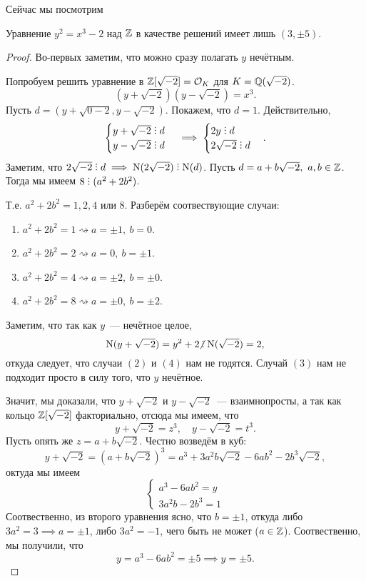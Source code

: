 	Сейчас мы посмотрим 
	\begin{statement} 
		Уравнение $y^2 = x^3 - 2$ над $\mathbb{Z}$ в качестве решений имеет лишь $(3, \pm 5)$.
	\end{statement}
	\begin{proof}
		Во-первых заметим, что можно сразу полагать $y$ нечётным. 

		Попробуем решить уравнение в $\mathbb{Z}[\sqrt{-2}] = \mathcal{O}_{K}$ для $K = \mathbb{Q}(\sqrt{-2})$. 
		\[
			(y + \sqrt{-2})(y - \sqrt{-2}) = x^3.
		\]
		Пусть $d = (y + \sqrt{0-2}, y - \sqrt{-2})$. Покажем, что $d = 1$. Действительно, 
		\[
			\begin{cases} y + \sqrt{-2} \divby d \\ y - \sqrt{-2} \divby d \end{cases}	\implies \begin{cases} 2y \divby d \\ 2\sqrt{-2} \divby d \end{cases}.
		\]	
		Заметим, что $2\sqrt{-2} \divby d \implies \Nm(2 \sqrt{-2}) \divby \Nm(d)$. Пусть $d = a + b \sqrt{-2}, \ a, b \in \mathbb{Z}$. Тогда  мы имеем $8 \divby (a^2 + 2b^2)$. 
		
		Т.е. $a^2 + 2b^2 = 1, 2, 4$ или 8. Разберём соотвествующие случаи: 
		\begin{enumerate}
			\item $a^2 + 2b^2 = 1  \rightsquigarrow a = \pm 1,\  b = 0$. 

			\item $a^2 + 2b^2 = 2 \rightsquigarrow a = 0, \ b = \pm 1$. 

			\item $a^2 + 2b^2 = 4 \rightsquigarrow a = \pm 2, \ b = \pm 0$. 

			\item $a^2 + 2b^2 = 8 \rightsquigarrow a = \pm 0, \ b = \pm 2$. 
		\end{enumerate}

		Заметим, что так как $y$~--- нечётное целое, 
		\[
			\Nm(y + \sqrt{-2}) = y^2 + 2 \notdivby \Nm(\sqrt{-2}) = 2,
		\]
		откуда следует, что случаи $(2)$ и $(4)$ нам не годятся. Случай $(3)$ нам не подходит просто в силу того, что $y$ нечётное. 

		Значит, мы доказали, что $y + \sqrt{-2}$ и $y - \sqrt{-2}$~--- взаимнопросты, а так как кольцо $\mathbb{Z}[\sqrt{-2}]$ факториально, отсюда мы имеем, что 
		\[
			y + \sqrt{-2} = z^3, \quad y - \sqrt{-2} = t^3. 
		\]
		Пусть опять же $z = a + b \sqrt{-2}$. Честно возведём в куб: 
		\[
			y + \sqrt{-2} = (a + b\sqrt{-2})^3 = a^3 + 3a^2 b \sqrt{-2} - 6 a b^2 - 2 b^3 \sqrt{-2},
		\]
		октуда мы имеем 
		\[
			\begin{cases} a^3 - 6ab^2 = y \\ 3a^2 b - 2b^3 = 1 \end{cases}
		\]
		Соотвественно, из второго уравнения ясно, что $b = \pm1$, откуда либо $3a^2 = 3 \implies a = \pm 1$, либо $3a^2 = -1$, чего быть не может ($a \in \mathbb{Z}$). Соотвественно, мы получили, что 
		\[
			y = a^3 - 6ab^2 = \pm 5 \implies y = \pm 5.
		\]
	\end{proof}






